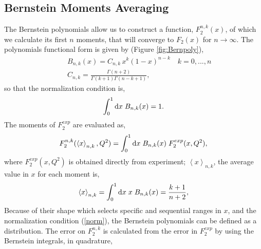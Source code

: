 \documentclass[
twocolumn,
aps,prd,
nofootinbib,
superscriptaddress,
showpacs,ligh
tightenlines, 
]{revtex4}
\begin{document}
\subsection{Bernstein Moments Averaging}
The Bernstein polynomials allow us to construct a function,
$F_2^{n, k}(x)$, of which we calculate its first $n$ moments, that will converge to $F_2(x)$ for $n \rightarrow \infty$.
The polynomials functional form is given by (Figure \ref{fig:Bernpoly}),
\begin{subequations}
\begin{eqnarray}
\label{eq:171}
&& B_{n,k}(x)  = C_{n,k} \, x^{k} (1-x)^{n - k}  \quad k=0,...,n \\
&& C_{n,k}  =  \frac{\Gamma(n + 2)}{\Gamma(k + 1)\Gamma( n - k + 1)},  %
\end{eqnarray}
\end{subequations}
so that the normalization condition is,
\begin{equation}
\int_0^1 \mathrm{d}x \hspace{1mm} B_{n,k}(x)  = 1. 
\label{norm}
\end{equation}
The moments of $F_{2}^{exp}$ are evaluated as, 
\begin{equation}
\label{eq:175}
F^{n,k}_2(\left\langle x  \right\rangle_{n,k}, Q^{2}) =  \int_0^1 \mathrm{d}x \hspace{1mm} B_{n,k}(x) \hspace{1mm} F_{2}^{exp}(x,Q^{2}), 
\end{equation}
where $F_2^{exp}(x,Q^2)$ is obtained directly from experiment; 
$\left\langle x  \right\rangle_{n,k}$, the average value in $x$ for each moment is, 
\begin{equation}\label{eq:173}
\left\langle x  \right\rangle_{n,k} = \int_0^1 \mathrm{d}x \hspace{1mm} x \hspace{1mm} B_{n,k}(x) = \frac{k + 1}{n + 2},
\end{equation}
Because of their shape which selects specific and sequential ranges in $x$, and the normalization condition (\ref{norm}), the Bernstein polynomials can be defined as a distribution. The error on $F^{n,k}_{2}$ is calculated from the error in $F_{2}^{exp}$ by using the Bernstein integrals, in quadrature, 
\end{document}
